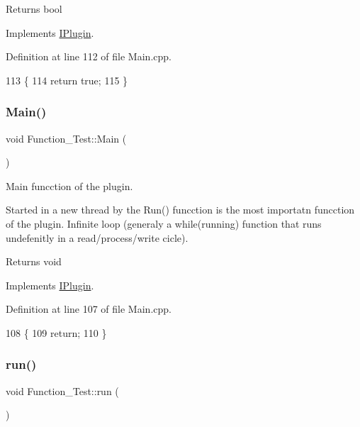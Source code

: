 \begin{DoxyReturn}{Returns}
bool 
\end{DoxyReturn}


Implements \hyperlink{class_i_plugin_a418cff309436d3a15d9a4ce7369db6dd}{I\+Plugin}.



Definition at line 112 of file Main.\+cpp.


\begin{DoxyCode}
113 \{
114     \textcolor{keywordflow}{return} \textcolor{keyword}{true};
115 \}
\end{DoxyCode}
\mbox{\label{class_function___test_a87d81cc4014216aa2523ef69c5b35dff}} 
\subsubsection{\texorpdfstring{Main()}{Main()}}
{\footnotesize\ttfamily void Function\+\_\+\+Test\+::\+Main (\begin{DoxyParamCaption}{ }\end{DoxyParamCaption})\hspace{0.3cm}{\ttfamily [virtual]}}



Main funcction of the plugin. 

Started in a new thread by the Run() funcction is the most importatn funcction of the plugin. Infinite loop (generaly a while(running) function that runs undefenitly in a read/process/write cicle). \begin{DoxyReturn}{Returns}
void 
\end{DoxyReturn}


Implements \hyperlink{class_i_plugin_ab5fdb3b0f7afdcee04324dca01766749}{I\+Plugin}.



Definition at line 107 of file Main.\+cpp.


\begin{DoxyCode}
108 \{
109     \textcolor{keywordflow}{return};
110 \}
\end{DoxyCode}
\mbox{\label{class_function___test_ae9c552f668d5f2dad706677908d9e623}} 
\subsubsection{\texorpdfstring{run()}{run()}}
{\footnotesize\ttfamily void Function\+\_\+\+Test\+::run (\begin{DoxyParamCaption}{ }\end{DoxyParamCaption})\hspace{0.3cm}{\ttfamily [virtual]}}



